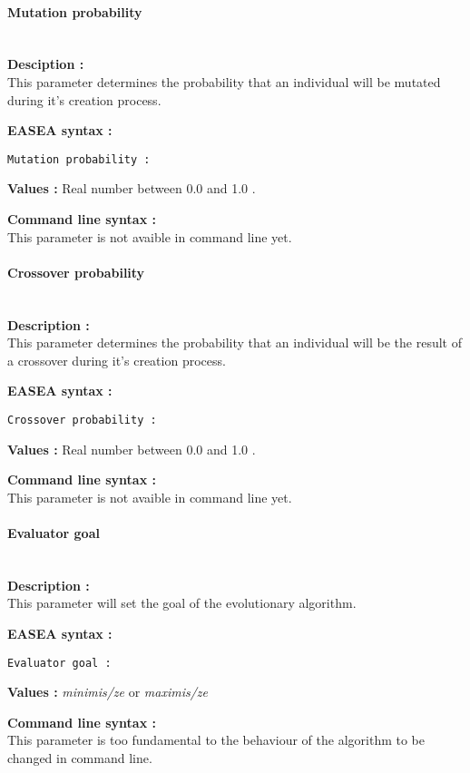 \documentclass{book}
\begin{document}
\paragraph{Mutation probability}\label{mutation-probability}
~\\

\textbf{Desciption :}\\This parameter determines the probability that an
individual will be mutated during it's creation process.

\textbf{EASEA syntax :}

\texttt{Mutation~probability~:}

\textbf{Values :} Real number between 0.0 and 1.0 .

\textbf{Command line syntax :}\\This parameter is not avaible in command
line yet.

\paragraph{Crossover probability}\label{crossover-probability}
~\\

\textbf{Description :}\\This parameter determines the probability that
an individual will be the result of a crossover during it's creation
process.

\textbf{EASEA syntax :}

\texttt{Crossover~probability~:}

\textbf{Values :} Real number between 0.0 and 1.0 .

\textbf{Command line syntax :}\\This parameter is not avaible in command
line yet.

\paragraph{Evaluator goal}\label{evaluator-goal}
~\\

\textbf{Description :}\\This parameter will set the goal of the
evolutionary algorithm.

\textbf{EASEA syntax :}

\texttt{Evaluator~goal~:}

\textbf{Values :} \emph{minimis/ze} or \emph{maximis/ze}

\textbf{Command line syntax :}\\This parameter is too fundamental to the
behaviour of the algorithm to be changed in command line.
\end{document}
